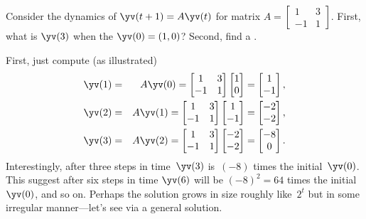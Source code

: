 \begin{example} \label{eg:2x2ccgrow}
Consider the dynamics of \(\yv(t+1)=A\yv(t)\) for matrix \(A=\begin{bmatrix} 1&3\\-1&1 \end{bmatrix}\).
First, what is \(\yv(3)\) when the  \(\yv(0)=(1,0)\)?
Second, find a .
\begin{solution} 
First, just compute (as illustrated)
\begin{eqnarray*}
\yv(1)&=&A\yv(0)=\begin{bmatrix} 1&3\\-1&1 \end{bmatrix}
\begin{bmatrix} 1\\0 \end{bmatrix}
=\begin{bmatrix} 1\\-1 \end{bmatrix},
\\\yv(2)&=&A\yv(1)=\begin{bmatrix} 1&3\\-1&1 \end{bmatrix}
\begin{bmatrix} 1\\-1 \end{bmatrix}
=\begin{bmatrix} -2\\-2 \end{bmatrix},
\\\yv(3)&=&A\yv(2)=\begin{bmatrix} 1&3\\-1&1 \end{bmatrix}
\begin{bmatrix} -2\\-2 \end{bmatrix}
=\begin{bmatrix} -8\\0 \end{bmatrix}.
\end{eqnarray*}
%
Interestingly, after three steps in time~\(\yv(3)\) is~\((-8)\) times the initial~\(\yv(0)\).
This suggest after six steps in time \(\yv(6)\) will be \((-8)^2=64\) times the initial~\(\yv(0)\), and so on.
Perhaps the solution grows in size roughly like~\(2^t\) but in some irregular manner---let's see via a general solution.


\end{solution}
\end{example}
